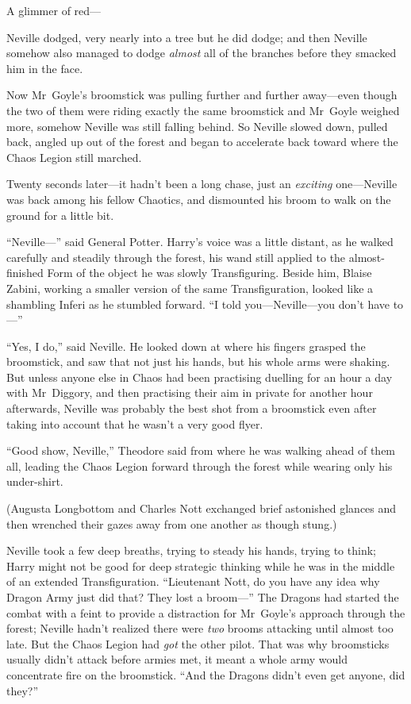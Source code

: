 A glimmer of red—

Neville dodged, very nearly into a tree but he did dodge; and then Neville somehow also managed to dodge \emph{almost} all of the branches before they smacked him in the face.

Now Mr~Goyle’s broomstick was pulling further and further away—even though the two of them were riding exactly the same broomstick and Mr~Goyle weighed more, somehow Neville was still falling behind. So Neville slowed down, pulled back, angled up out of the forest and began to accelerate back toward where the Chaos Legion still marched.

Twenty seconds later—it hadn’t been a long chase, just an \emph{exciting} one—Neville was back among his fellow Chaotics, and dismounted his broom to walk on the ground for a little bit.

“Neville—” said General Potter. Harry’s voice was a little distant, as he walked carefully and steadily through the forest, his wand still applied to the almost-finished Form of the object he was slowly Transfiguring. Beside him, Blaise Zabini, working a smaller version of the same Transfiguration, looked like a shambling Inferi as he stumbled forward. “I told you—Neville—you don’t have to—”

“Yes, I do,” said Neville. He looked down at where his fingers grasped the broomstick, and saw that not just his hands, but his whole arms were shaking. But unless anyone else in Chaos had been practising duelling for an hour a day with Mr~Diggory, and then practising their aim in private for another hour afterwards, Neville was probably the best shot from a broomstick even after taking into account that he wasn’t a very good flyer.

“Good show, Neville,” Theodore said from where he was walking ahead of them all, leading the Chaos Legion forward through the forest while wearing only his under-shirt.

(Augusta Longbottom and Charles Nott exchanged brief astonished glances and then wrenched their gazes away from one another as though stung.)

Neville took a few deep breaths, trying to steady his hands, trying to think; Harry might not be good for deep strategic thinking while he was in the middle of an extended Transfiguration. “Lieutenant Nott, do you have any idea why Dragon Army just did that? They lost a broom—” The Dragons had started the combat with a feint to provide a distraction for Mr~Goyle’s approach through the forest; Neville hadn’t realized there were \emph{two} brooms attacking until almost too late. But the Chaos Legion had \emph{got} the other pilot. That was why broomsticks usually didn’t attack before armies met, it meant a whole army would concentrate fire on the broomstick. “And the Dragons didn’t even get anyone, did they?”

